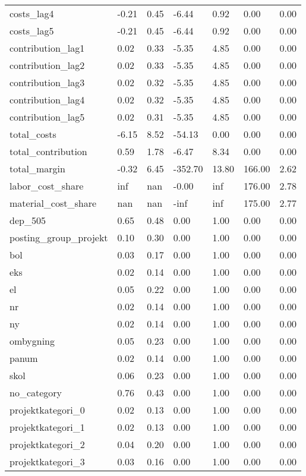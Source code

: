 \begin{landscape}
\begin{longtable}[h!]{lllllll}
costs_lag4 & -0.21 & 0.45 & -6.44 & 0.92 & 0.00 & 0.00 \\
costs_lag5 & -0.21 & 0.45 & -6.44 & 0.92 & 0.00 & 0.00 \\
contribution_lag1 & 0.02 & 0.33 & -5.35 & 4.85 & 0.00 & 0.00 \\
contribution_lag2 & 0.02 & 0.33 & -5.35 & 4.85 & 0.00 & 0.00 \\
contribution_lag3 & 0.02 & 0.32 & -5.35 & 4.85 & 0.00 & 0.00 \\
contribution_lag4 & 0.02 & 0.32 & -5.35 & 4.85 & 0.00 & 0.00 \\
contribution_lag5 & 0.02 & 0.31 & -5.35 & 4.85 & 0.00 & 0.00 \\
total_costs & -6.15 & 8.52 & -54.13 & 0.00 & 0.00 & 0.00 \\
total_contribution & 0.59 & 1.78 & -6.47 & 8.34 & 0.00 & 0.00 \\
total_margin & -0.32 & 6.45 & -352.70 & 13.80 & 166.00 & 2.62 \\
labor_cost_share & inf & nan & -0.00 & inf & 176.00 & 2.78 \\
material_cost_share & nan & nan & -inf & inf & 175.00 & 2.77 \\
dep_505 & 0.65 & 0.48 & 0.00 & 1.00 & 0.00 & 0.00 \\
posting_group_projekt & 0.10 & 0.30 & 0.00 & 1.00 & 0.00 & 0.00 \\
bol & 0.03 & 0.17 & 0.00 & 1.00 & 0.00 & 0.00 \\
eks & 0.02 & 0.14 & 0.00 & 1.00 & 0.00 & 0.00 \\
el & 0.05 & 0.22 & 0.00 & 1.00 & 0.00 & 0.00 \\
nr & 0.02 & 0.14 & 0.00 & 1.00 & 0.00 & 0.00 \\
ny & 0.02 & 0.14 & 0.00 & 1.00 & 0.00 & 0.00 \\
ombygning & 0.05 & 0.23 & 0.00 & 1.00 & 0.00 & 0.00 \\
panum & 0.02 & 0.14 & 0.00 & 1.00 & 0.00 & 0.00 \\
skol & 0.06 & 0.23 & 0.00 & 1.00 & 0.00 & 0.00 \\
no_category & 0.76 & 0.43 & 0.00 & 1.00 & 0.00 & 0.00 \\
projektkategori_0 & 0.02 & 0.13 & 0.00 & 1.00 & 0.00 & 0.00 \\
projektkategori_1 & 0.02 & 0.13 & 0.00 & 1.00 & 0.00 & 0.00 \\
projektkategori_2 & 0.04 & 0.20 & 0.00 & 1.00 & 0.00 & 0.00 \\
projektkategori_3 & 0.03 & 0.16 & 0.00 & 1.00 & 0.00 & 0.00 \\

\end{longtable}
\end{landscape}

